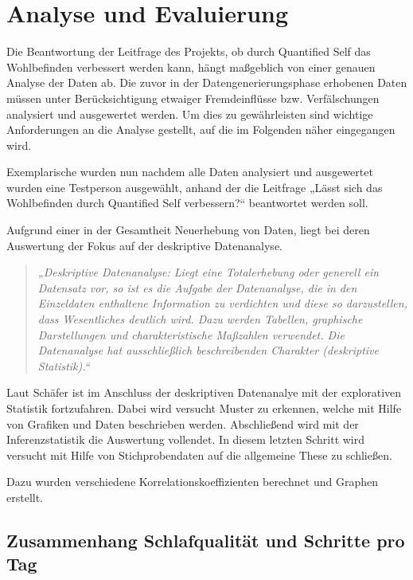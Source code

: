 
\chapter{Analyse und Evaluierung}
\label{ch:AnalyseUndEvaluierung}

Die Beantwortung der Leitfrage des Projekts, ob durch Quantified Self das Wohlbefinden verbessert werden kann, hängt maßgeblich von einer genauen Analyse der Daten ab. 
Die zuvor in der Datengenerierungsphase erhobenen Daten müssen unter Berücksichtigung etwaiger Fremdeinflüsse bzw. Verfälschungen analysiert und ausgewertet werden.
Um dies zu gewährleisten sind wichtige Anforderungen an die Analyse gestellt, auf die im Folgenden näher eingegangen wird.

Exemplarische wurden nun nachdem alle Daten analysiert und ausgewertet wurden eine Testperson ausgewählt, anhand der die Leitfrage „Lässt sich das Wohlbefinden durch Quantified Self verbessern?“ beantwortet werden soll.

Aufgrund einer in der Gesamtheit Neuerhebung von Daten, liegt bei deren Auswertung der Fokus auf der deskriptive Datenanalyse.

\begin{quote}
\textit{„Deskriptive Datenanalyse: Liegt eine Totalerhebung oder generell ein Datensatz vor, so ist es die Aufgabe der Datenanalyse, die in den Einzeldaten enthaltene Information zu verdichten und diese so darzustellen, dass Wesentliches deutlich wird. Dazu werden Tabellen, graphische Darstellungen und charakteristische Maßzahlen verwendet.  Die Datenanalyse hat ausschließlich beschreibenden Charakter (deskriptive Statistik).“} 
\end{quote}
\cite[Springer Gabler Wirtschaftslexikon]{web:SpringerDatenanalyse}


Laut Schäfer\cite{Schafer2010} ist im Anschluss der deskriptiven Datenanalye mit der explorativen Statistik fortzufahren.
Dabei wird versucht Muster zu erkennen, welche mit Hilfe von Grafiken und Daten beschrieben werden.
Abschließend wird mit der Inferenzstatistik die Auswertung vollendet.
In diesem letzten Schritt wird versucht mit Hilfe von Stichprobendaten auf die allgemeine These zu schließen.

Dazu wurden verschiedene Korrelationskoeffizienten berechnet und Graphen erstellt.


\section{Zusammenhang Schlafqualität und Schritte pro Tag}
\label{ch:AnalyseUndEvaluierung:sec:ZusammenhangSchlafqualitätProSchrittenAmTag}


